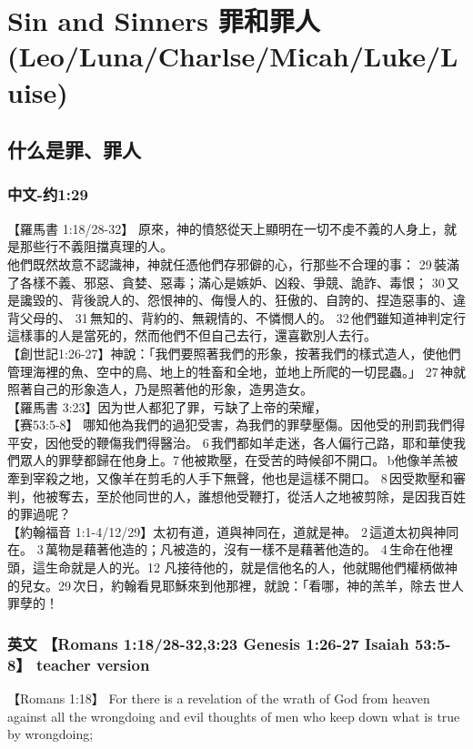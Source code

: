 \chapter{Sin and Sinners 罪和罪人(Leo/Luna/Charlse/Micah/Luke/Luise)}
\section{什么是罪、罪人}
\subsection{中文-约1:29}

【羅馬書 1:18/28-32】 原來，神的憤怒從天上顯明在一切不虔不義的人身上，就是那些行不義阻擋真理的人。\\
他們既然故意不認識神，神就任憑他們存邪僻的心，行那些不合理的事： 29 裝滿了各樣不義、邪惡、貪婪、惡毒；滿心是嫉妒、凶殺、爭競、詭詐、毒恨； 30 又是讒毀的、背後說人的、怨恨神的、侮慢人的、狂傲的、自誇的、捏造惡事的、違背父母的、 31 無知的、背約的、無親情的、不憐憫人的。 32 他們雖知道神判定行這樣事的人是當死的，然而他們不但自己去行，還喜歡別人去行。\\
【創世記1:26-27】神說：「我們要照著我們的形象，按著我們的樣式造人，使他們管理海裡的魚、空中的鳥、地上的牲畜和全地，並地上所爬的一切昆蟲。」 27 神就照著自己的形象造人，乃是照著他的形象，造男造女。\\
【羅馬書 3:23】因为世人都犯了罪，亏缺了上帝的荣耀，\\
【赛53:5-8】 哪知他為我們的過犯受害，為我們的罪孽壓傷。因他受的刑罰我們得平安，因他受的鞭傷我們得醫治。 6 我們都如羊走迷，各人偏行己路，耶和華使我們眾人的罪孽都歸在他身上。7 他被欺壓，在受苦的時候卻不開口。 b他像羊羔被牽到宰殺之地，又像羊在剪毛的人手下無聲，他也是這樣不開口。 8 因受欺壓和審判，他被奪去，至於他同世的人，誰想他受鞭打，從活人之地被剪除，是因我百姓的罪過呢？\\
【約翰福音 1:1-4/12/29】太初有道，道與神同在，道就是神。 2 這道太初與神同在。 3 萬物是藉著他造的；凡被造的，沒有一樣不是藉著他造的。 4 生命在他裡頭，這生命就是人的光。12 凡接待他的，就是信他名的人，他就賜他們權柄做神的兒女。29 次日，約翰看見耶穌來到他那裡，就說：「看哪，神的羔羊，除去 世人罪孽的！


\subsection{英文 【Romans 1:18/28-32,3:23 Genesis 1:26-27 Isaiah 53:5-8】 teacher version}
【Romans 1:18】 For there is a revelation of the wrath of God from heaven against all the wrongdoing and evil thoughts of men who keep down what is true by wrongdoing;\\

